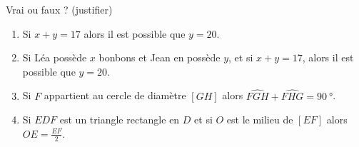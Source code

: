 
\begin{exercice}\label{exo2smath-0316}

    Vrai ou faux ? (justifier)
    \begin{enumerate}
        \item
            Si \( x+y=17\) alors il est possible que \( y=20\).
        \item
            Si Léa possède \( x\) bonbons et Jean en possède \( y\), et si \( x+y=17\), alors il est possible que \( y=20\).
        \item
            Si \( F\) appartient au cercle de diamètre \( [GH]\) alors \( \widehat{FGH}+\widehat{FHG}=\SI{90}{\degree}\).
        \item
            Si \( EDF\) est un triangle rectangle en \( D\) et si \( O\) est le milieu de \( [EF]\) alors \( OE=\frac{ EF }{ 2 }\).
    \end{enumerate}

\end{exercice}
